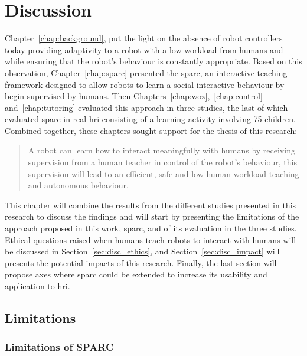 \chapter{Discussion} \label{chap:discussion}
\glsresetall

Chapter~\ref{chap:background}, put the light on the absence of robot controllers today providing adaptivity to a robot with a low workload from humans and while ensuring that the robot's behaviour is constantly appropriate. Based on this observation, Chapter~\ref{chap:sparc} presented the \gls{sparc}, an interactive teaching framework designed to allow robots to learn a social interactive behaviour by begin supervised by humans. Then Chapters~\ref{chap:woz},~\ref{chap:control} and~\ref{chap:tutoring} evaluated this approach in three studies, the last of which evaluated \gls{sparc} in real \gls{hri} consisting of a learning activity involving 75 children. Combined together, these chapters sought support for the thesis of this research:

\begin{quote}
	A robot can learn how to interact meaningfully with humans by receiving supervision from a human teacher in control of the robot's behaviour, this supervision will lead to an efficient, safe and low human-workload teaching and autonomous behaviour.	
\end{quote}

This chapter will combine the results from the different studies presented in this research to discuss the findings and will start by presenting the limitations of the approach proposed in this work, \gls{sparc}, and of its evaluation in the three studies. Ethical questions raised when humans teach robots to interact with humans will be discussed in Section~\ref{sec:disc_ethics}, and Section~\ref{sec:disc_impact} will presents the potential impacts of this research. Finally, the last section will propose axes where \gls{sparc} could be extended to increase its usability and application to \gls{hri}.

\section{Limitations} \label{sec:disc_limitations}

\subsection{Limitations of SPARC}

